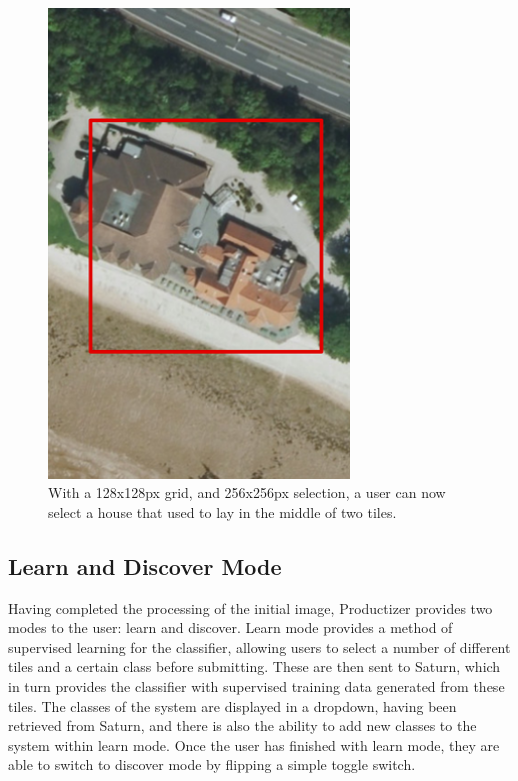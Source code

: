 \begin{figure}[H]
    \centering
    \includegraphics[width=8cm]{figs/6/fuzzy-new}
    \caption{With a 128x128px grid, and 256x256px selection, a user can now select a house that used to lay in the middle of two tiles.}
    \label{fig:prod:fuzzynew}
\end{figure}

\subsection{Learn and Discover Mode}

Having completed the processing of the initial image, Productizer provides two modes to the user: learn and discover. Learn mode provides a method of supervised learning for the classifier, allowing users to select a number of different tiles and a certain class before submitting. These are then sent to Saturn, which in turn provides the classifier with supervised training data generated from these tiles. The classes of the system are displayed in a dropdown, having been retrieved from Saturn, and there is also the ability to add new classes to the system within learn mode. Once the user has finished with learn mode, they are able to switch to discover mode by flipping a simple toggle switch.

